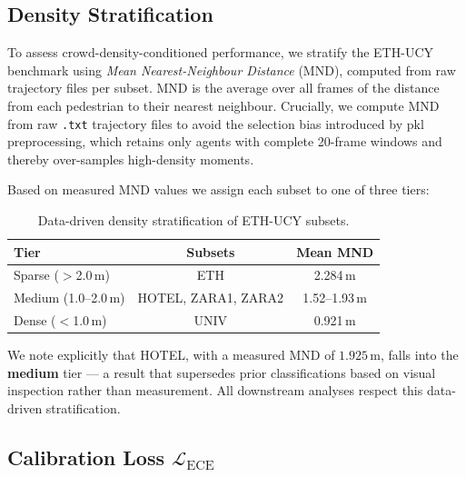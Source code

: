 \subsection{Density Stratification}
\label{sec:method:density}

To assess crowd-density-conditioned performance, we stratify the ETH-UCY
benchmark using \emph{Mean Nearest-Neighbour Distance} (MND), computed from raw
trajectory files per subset. MND is the average over all frames of the distance
from each pedestrian to their nearest neighbour. Crucially, we compute MND from
raw \texttt{.txt} trajectory files to avoid the selection bias introduced by
pkl preprocessing, which retains only agents with complete 20-frame windows and
thereby over-samples high-density moments.

Based on measured MND values we assign each subset to one of three tiers:

\begin{table}[h]
\centering
\small
\caption{Data-driven density stratification of ETH-UCY subsets.}
\label{tab:density}
\begin{tabular}{l c c}
\toprule
Tier & Subsets & Mean MND \\
\midrule
Sparse (\(>\)2.0\,m) & ETH & 2.284\,m \\
Medium (1.0--2.0\,m) & HOTEL, ZARA1, ZARA2 & 1.52--1.93\,m \\
Dense (\(<\)1.0\,m) & UNIV & 0.921\,m \\
\bottomrule
\end{tabular}
\end{table}

We note explicitly that HOTEL, with a measured MND of \(1.925\,\text{m}\),
falls into the \textbf{medium} tier --- a result that supersedes prior
classifications based on visual inspection rather than measurement. All
downstream analyses respect this data-driven stratification.

\subsection{Calibration Loss \(\mathcal{L}_{\text{ECE}}\)}
\label{sec:method:ece}

